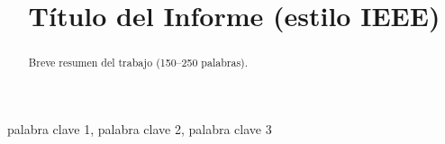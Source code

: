 \documentclass[conference]{IEEEtran}
\title{Título del Informe (estilo IEEE)}
\author{
  \IEEEauthorblockN{Nombre Apellido}
  \IEEEauthorblockA{Institución / Departamento\\
  Ciudad, País\\
  \texttt{correo@ejemplo.com}}
}
\begin{document}
\maketitle

\begin{abstract}
Breve resumen del trabajo (150–250 palabras).
\end{abstract}

\begin{IEEEkeywords}
palabra clave 1, palabra clave 2, palabra clave 3
\end{IEEEkeywords}









\nocite{*}
% 

\appendices

\end{document}
